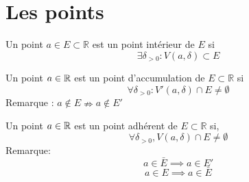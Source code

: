 \section{Les points}
	\begin{mydef}
		Un point $a\in E \subset\mathbb{R}$ est un point intérieur de $E$ si \[\exists\delta_{>0} : V(a,\delta)\subset E\]
	\end{mydef}
	\begin{mydef}
			Un point $a\in\mathbb{R}$ est un point d'accumulation de $E\subset\mathbb{R}$ si \[\forall\delta_{>0} : V'(a,\delta)\cap E\neq\emptyset\]
			Remarque : $a\notin E \nRightarrow a\notin E'$
	\end{mydef}
	\begin{mydef}
		Un point $a\in\mathbb{R}$ est un point adhérent de $E\subset\mathbb{R}$ si, \[\forall\delta_{>0}, V(a,\delta)\cap E\neq\emptyset\]
		Remarque:\\
		 \[a\in \bar{E}\implies a\in E'\]
		 \[a\in E\implies a\in\bar{E}\]
	\end{mydef}